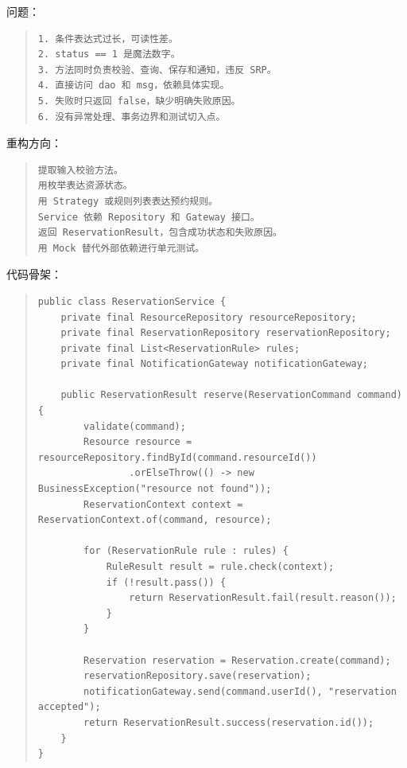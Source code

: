 \documentclass[UTF8,zihao=-4]{ctexart}
\begin{document}
问题：


\begin{quote}
\footnotesize
\begin{verbatim}
1. 条件表达式过长，可读性差。
2. status == 1 是魔法数字。
3. 方法同时负责校验、查询、保存和通知，违反 SRP。
4. 直接访问 dao 和 msg，依赖具体实现。
5. 失败时只返回 false，缺少明确失败原因。
6. 没有异常处理、事务边界和测试切入点。
\end{verbatim}
\end{quote}


重构方向：


\begin{quote}
\footnotesize
\begin{verbatim}
提取输入校验方法。
用枚举表达资源状态。
用 Strategy 或规则列表表达预约规则。
Service 依赖 Repository 和 Gateway 接口。
返回 ReservationResult，包含成功状态和失败原因。
用 Mock 替代外部依赖进行单元测试。
\end{verbatim}
\end{quote}


代码骨架：


\begin{quote}
\footnotesize
\begin{verbatim}
public class ReservationService {
    private final ResourceRepository resourceRepository;
    private final ReservationRepository reservationRepository;
    private final List<ReservationRule> rules;
    private final NotificationGateway notificationGateway;

    public ReservationResult reserve(ReservationCommand command) {
        validate(command);
        Resource resource = resourceRepository.findById(command.resourceId())
                .orElseThrow(() -> new BusinessException("resource not found"));
        ReservationContext context = ReservationContext.of(command, resource);

        for (ReservationRule rule : rules) {
            RuleResult result = rule.check(context);
            if (!result.pass()) {
                return ReservationResult.fail(result.reason());
            }
        }

        Reservation reservation = Reservation.create(command);
        reservationRepository.save(reservation);
        notificationGateway.send(command.userId(), "reservation accepted");
        return ReservationResult.success(reservation.id());
    }
}
\end{verbatim}
\end{quote}
\end{document}
